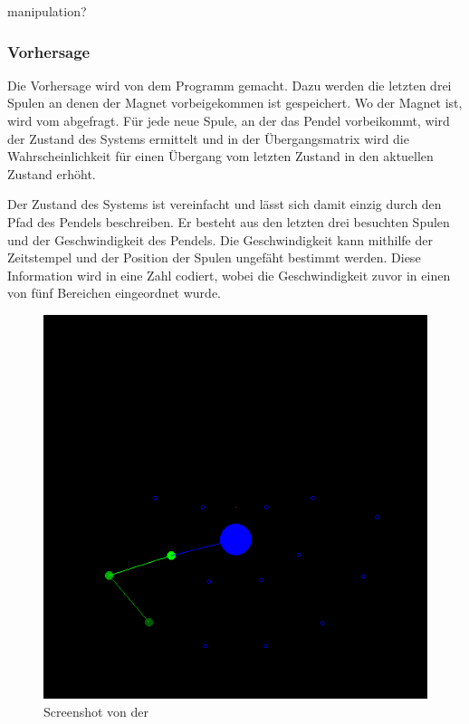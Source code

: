\TODO manipulation?

\subsubsection{Vorhersage}
Die Vorhersage wird von dem Programm  gemacht.
Dazu werden die letzten drei Spulen an denen der Magnet vorbeigekommen ist gespeichert.
Wo der Magnet ist, wird vom  abgefragt.
Für jede neue Spule, an der das Pendel vorbeikommt, wird der Zustand des Systems ermittelt und in der Übergangsmatrix wird die Wahrscheinlichkeit für einen Übergang vom letzten Zustand in den aktuellen Zustand erhöht.

Der Zustand des Systems ist vereinfacht und lässt sich damit einzig durch den Pfad des Pendels beschreiben.
Er besteht aus den letzten drei besuchten Spulen und der Geschwindigkeit des Pendels.
Die Geschwindigkeit kann mithilfe der Zeitstempel und der Position der Spulen ungefäht bestimmt werden.
Diese Information wird in eine Zahl codiert, wobei die Geschwindigkeit zuvor in einen von fünf Bereichen eingeordnet wurde.

\begin{figure}[hbt]
  \centering
  \includegraphics[width=\textwidth]{images/prediction.png}
  \caption{Screenshot von der }
  \label{fig:screenmarkov}
\end{figure}

